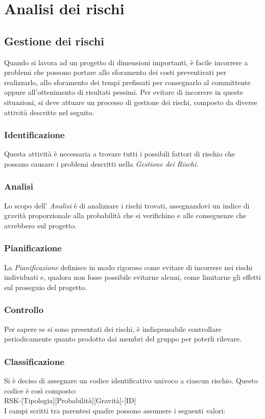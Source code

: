 \section{Analisi dei rischi}
	\subsection{Gestione dei rischi}
Quando si lavora ad un progetto di dimensioni importanti, è facile incorrere a problemi che possono portare allo sforamento dei costi preventivati per realizzarlo, allo sforamento dei tempi prefissati per consegnarlo al committente oppure all'ottenimento di risultati pessimi. \newline
Per evitare di incorrere in queste situazioni, si deve attuare un processo di gestione dei rischi, composto da diverse attività descritte nel seguito.

	\subsubsection{Identificazione}
Questa attività è necessaria a trovare tutti i possibili fattori di rischio che possano causare i problemi descritti nella \textit{Gestione dei Rischi}.

	\subsubsection{Analisi}
	 Lo scopo dell' \textit{Analisi} è di analizzare i rischi trovati, assegnandovi un indice di gravità proporzionale alla probabilità che si verifichino e alle conseguenze che avrebbero sul progetto.

	\subsubsection{Pianificazione}
La \textit{Pianificazione} definisce in modo rigoroso come evitare di incorrere nei rischi individuati e, qualora non fosse possibile evitarne alcuni, come limitarne gli effetti sul proseguio del progetto.

	\subsubsection{Controllo} 
 Per sapere se si sono presentati dei rischi, è indispensabile controllare periodicamente quanto prodotto dai membri del gruppo per poterli rilevare.

   
		\subsubsection{Classificazione}
Si è deciso di assegnare un codice identificativo univoco a ciascun rischio. Questo codice è così composto: \\
		RSK-[Tipologia][Probabilità][Gravità]-[ID] \\
I campi scritti tra parentesi quadre possono assumere i seguenti valori:
  
